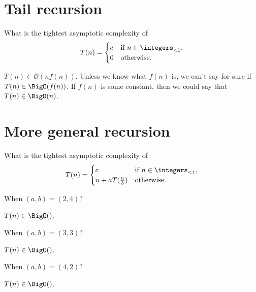 \documentclass[
  coursecode={CISC/CMPE 365},
  assignmentname={Lab 1},
  studentnumber=20053722,
  name={Bryan Hoang}
]{
  ltxanswer%
}
\begin{document}
  \section*{Tail recursion}
  \begin{questions}
    \question{}
    What is the tightest asymptotic complexity of
    \begin{equation*}
      T(n) = \begin{cases}
        c & \text{if}\ n \in \integers_{< 1}, \\
        0 & \text{otherwise}.
      \end{cases}
    \end{equation*}
    \begin{solution}
      \(T(n) \in \mathcal{O}(nf(n))\). Unless we know what \(f(n)\) is, we can't say for sure if \(T(n) \in \BigO(f(n))\). If \(f(n)\) is some constant, then we could say that \(T(n) \in \BigO(n)\).
    \end{solution}
  \end{questions}

  \section*{More general recursion}
  What is the tightest asymptotic complexity of
  \begin{equation*}
    T(n) = \begin{cases}
      c                   & \text{if}\ n \in \integers_{\le 1}, \\
      n + aT(\frac{n}{b}) & \text{otherwise}.
    \end{cases}
  \end{equation*}
  \begin{questions}
    \question{}
    When \((a, b) = (2, 4)\)?
    \begin{solution}
      \(T(n) \in \BigO()\).
    \end{solution}
    \question{}
    When \((a, b) = (3, 3)\)?
    \begin{solution}
      \(T(n) \in \BigO()\).
    \end{solution}
    \question{}
    When \((a, b) = (4, 2)\)?
    \begin{solution}
      \(T(n) \in \BigO()\).
    \end{solution}
  \end{questions}
\end{document}
